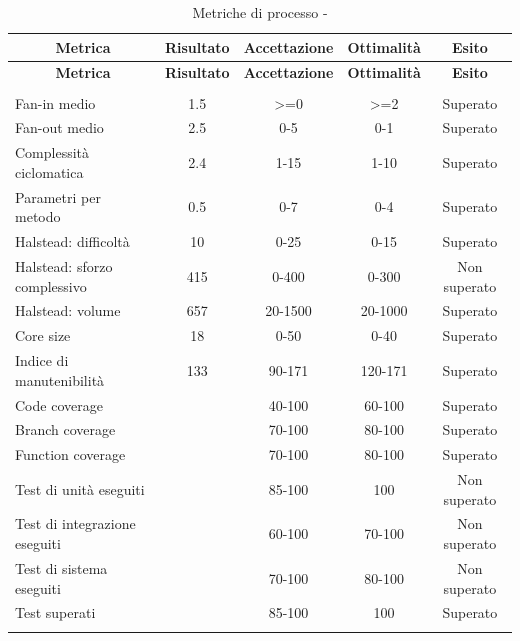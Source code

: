 \begin{longtable}{|m{5cm}|c|c|c|c|}
	\hline \multicolumn{1}{|c|}{\textbf{Metrica}} & \multicolumn{1}{c|}{\textbf{Risultato}} & \multicolumn{1}{c|}{\textbf{Accettazione}} & \multicolumn{1}{c|}{\textbf{Ottimalità}} & \multicolumn{1}{c|}{\textbf{Esito}}\\
	\hline 
	\endfirsthead
	
	\hline \multicolumn{1}{|c|}{\textbf{Metrica}} & \multicolumn{1}{c|}{\textbf{Risultato}} & \multicolumn{1}{c|}{\textbf{Accettazione}} & \multicolumn{1}{c|}{\textbf{Ottimalità}} & \multicolumn{1}{c|}{\textbf{Esito}}\\
	\hline 
	\endhead
	
	\hline \multicolumn{5}{|r|}{\ToBeContinued} \\ 
	\hline
	\endfoot
	
	\endlastfoot
	
	\hline Fan-in medio & 1.5 & >=0 & >=2 & Superato \\
	\hline Fan-out medio & 2.5 & 0-5 & 0-1 & Superato \\
	\hline Complessità ciclomatica & 2.4 & 1-15 & 1-10 & Superato \\
	\hline Parametri per metodo & 0.5 & 0-7 & 0-4 & Superato \\
	\hline Halstead: difficoltà & 10 & 0-25 & 0-15 & Superato \\
	\hline Halstead: sforzo complessivo & 415 & 0-400 & 0-300 & Non superato\\
	\hline Halstead: volume & 657 & 20-1500 & 20-1000 & Superato \\
	\hline Core size & 18 & 0-50 & 0-40 & Superato \\
	\hline Indice di manutenibilità & 133 & 90-171 & 120-171 & Superato \\
	\hline Code coverage &  & 40-100 & 60-100 & Superato \\
	\hline Branch coverage &  & 70-100 & 80-100 & Superato \\
	\hline Function coverage &  & 70-100 & 80-100 & Superato \\
	\hline Test di unità eseguiti &  & 85-100 & 100 & Non superato \\
	\hline Test di integrazione eseguiti &  & 60-100 & 70-100 & Non superato \\
	\hline Test di sistema eseguiti &  & 70-100 & 80-100 & Non superato \\
	\hline Test superati &  & 85-100 & 100 & Superato \\
	\hline
	\caption{Metriche di processo - \RA{}}
\end{longtable}

